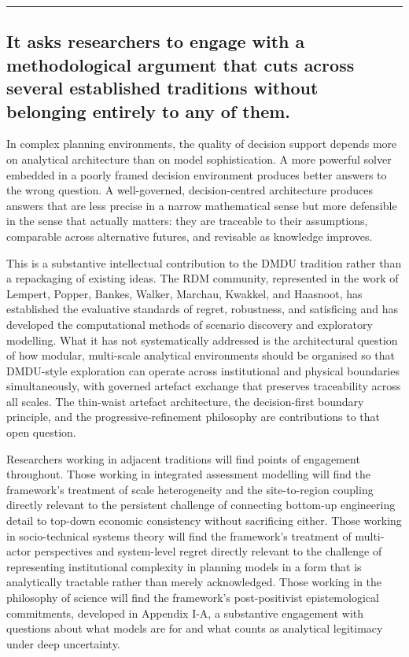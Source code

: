 \documentclass[
  11pt,
  a4paper,
  twoside,
  openright]{scrbook}
\begin{document}
\begin{center}\rule{0.5\linewidth}{0.5pt}\end{center}

\subsection{It asks researchers to engage with a methodological argument
that cuts across several established traditions without belonging
entirely to any of
them.}\label{it-asks-researchers-to-engage-with-a-methodological-argument-that-cuts-across-several-established-traditions-without-belonging-entirely-to-any-of-them.}

In complex planning environments, the quality of decision support
depends more on analytical architecture than on model sophistication. A
more powerful solver embedded in a poorly framed decision environment
produces better answers to the wrong question. A well-governed,
decision-centred architecture produces answers that are less precise in
a narrow mathematical sense but more defensible in the sense that
actually matters: they are traceable to their assumptions, comparable
across alternative futures, and revisable as knowledge improves.

This is a substantive intellectual contribution to the DMDU tradition
rather than a repackaging of existing ideas. The RDM community,
represented in the work of Lempert, Popper, Bankes, Walker, Marchau,
Kwakkel, and Haasnoot, has established the evaluative standards of
regret, robustness, and satisficing and has developed the computational
methods of scenario discovery and exploratory modelling. What it has not
systematically addressed is the architectural question of how modular,
multi-scale analytical environments should be organised so that
DMDU-style exploration can operate across institutional and physical
boundaries simultaneously, with governed artefact exchange that
preserves traceability across all scales. The thin-waist artefact
architecture, the decision-first boundary principle, and the
progressive-refinement philosophy are contributions to that open
question.

Researchers working in adjacent traditions will find points of
engagement throughout. Those working in integrated assessment modelling
will find the framework's treatment of scale heterogeneity and the
site-to-region coupling directly relevant to the persistent challenge of
connecting bottom-up engineering detail to top-down economic consistency
without sacrificing either. Those working in socio-technical systems
theory will find the framework's treatment of multi-actor perspectives
and system-level regret directly relevant to the challenge of
representing institutional complexity in planning models in a form that
is analytically tractable rather than merely acknowledged. Those working
in the philosophy of science will find the framework's post-positivist
epistemological commitments, developed in Appendix I-A, a substantive
engagement with questions about what models are for and what counts as
analytical legitimacy under deep uncertainty.
\end{document}
